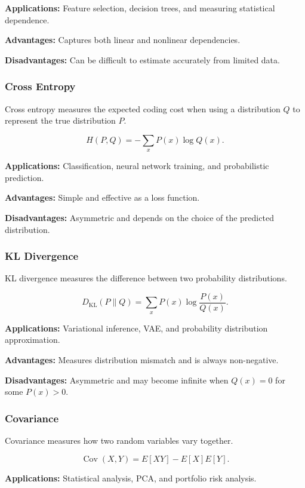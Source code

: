 \documentclass[10pt,a4paper]{article}
\begin{document}
		\textbf{Applications:}
		Feature selection, decision trees, and measuring statistical
		dependence.
		
		\textbf{Advantages:} Captures both linear and nonlinear
		dependencies.
		
		\textbf{Disadvantages:} Can be difficult to estimate accurately
		from limited data.
		
		
		\subsubsection{Cross Entropy}
		
		Cross entropy measures the expected coding cost when using
		a distribution $Q$ to represent the true distribution $P$.
		
		\[
		H(P,Q)=-\sum_x P(x)\log Q(x).
		\]
		
		\textbf{Applications:}
		Classification, neural network training, and probabilistic
		prediction.
		
		\textbf{Advantages:} Simple and effective as a loss function.
		
		\textbf{Disadvantages:} Asymmetric and depends on the choice
		of the predicted distribution.
		
		
		\subsubsection{KL Divergence}
		
		KL divergence measures the difference between two probability
		distributions.
		
		\[
		D_{\mathrm{KL}}(P\|Q)
		=\sum_x P(x)\log\frac{P(x)}{Q(x)}.
		\]
		
		\textbf{Applications:}
		Variational inference, VAE, and probability distribution
		approximation.
		
		\textbf{Advantages:} Measures distribution mismatch and
		is always non-negative.
		
		\textbf{Disadvantages:} Asymmetric and may become infinite
		when $Q(x)=0$ for some $P(x)>0$.
		
		
		\subsubsection{Covariance}
		
		Covariance measures how two random variables vary together.
		
		\[
		\operatorname{Cov}(X,Y)
		=E[XY]-E[X]E[Y].
		\]
		
		\textbf{Applications:}
		Statistical analysis, PCA, and portfolio risk analysis.
		
\end{document}
